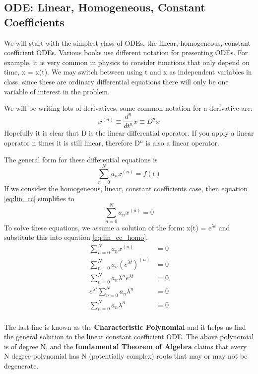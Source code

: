 \documentclass{article}
\newcommand{\be}{\begin{equation}}
\newcommand{\ee}{\end{equation}}
\begin{document}
\subsection*{ODE: Linear, Homogeneous, Constant Coefficients}
We will start with the simplest class of ODEs, the linear, homogeneous, constant coefficient ODEs.
Various books use different notation for presenting ODEs.
For example, it is very common in physics to consider functions that only depend on time, x = x(t).
We may switch between using t and x as independent variables in class, since these are ordinary differential equations there will only be one variable of interest in the problem.

We will be writing lots of derivatives, some common notation for a derivative are: 
\be
x^{(n)} \equiv \frac{d^n}{dt^n}x \equiv D^n x
\ee
Hopefully it is clear that D is the linear differential operator.
If you apply a linear operator n times it is still linear, therefore D$^n$ is also a linear operator.

The general form for these differential equations is
\be \label{eq:lin_cc}
\sum_{n=0}^N a_nx^{(n)} = f(t)
\ee
If we consider the homogeneous, linear, constant coefficients case, then equation \ref{eq:lin_cc} simplifies to
\be \label{eq:lin_cc_homo}
\sum_{n=0}^N a_nx^{(n)} = 0
\ee
To solve these equations, we assume a solution of the form: x(t) = e$^{\lambda t}$ and substitute this into equation \ref{eq:lin_cc_homo}.
\be
\begin{split}
    \sum_{n=0}^N a_nx^{(n)} &= 0\\
    \sum_{n=0}^N a_n \left(e^{\lambda t}\right) ^{(n)} &= 0\\
    \sum_{n=0}^N a_n \lambda^n e^{\lambda t} &= 0\\
    e^{\lambda t} \sum_{n=0}^N a_n \lambda^n &= 0\\
    \sum_{n=0}^N a_n \lambda^n &= 0\\
\end{split}
\ee

The last line is known as the \textbf{Characteristic Polynomial} and it helps us find the general solution to the linear constant coefficient ODE.
The above polynomial is of degree N, and the \textbf{fundamental Theorem of Algebra} claims that every N degree polynomial has N (potentially complex) roots that may or may not be degenerate.
\end{document}
